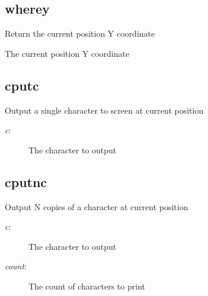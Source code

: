 \subsection{wherey}
\begin{description}[leftmargin=2cm,style=nextline]
\item [Description:] {Return the current position Y coordinate}
\item [Syntax:] 
\item [Desription:] {The current position Y coordinate}
\end{description}

\subsection{cputc}
\begin{description}[leftmargin=2cm,style=nextline]
\item [Description:] {Output a single character to screen at current position}
\item [Syntax:] 
\item [Parameters:]
\begin{description}\item[]
\item [{\em c}:] {The character to output}
\end{description}
\end{description}

\subsection{cputnc}
\begin{description}[leftmargin=2cm,style=nextline]
\item [Description:] {Output N copies of a character at current position}
\item [Syntax:] 
\item [Parameters:]
\begin{description}\item[]
\item [{\em c}:] {The character to output}
\item [{\em count}:] {The count of characters to print}
\end{description}
\end{description}

